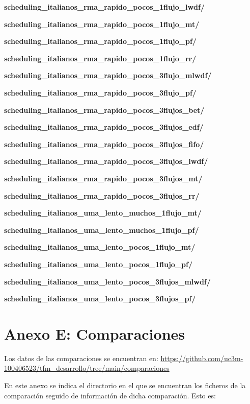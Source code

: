 \documentclass[12pt]{report} %
\begin{document}
\textbf{scheduling\_italianos\_rma\_rapido\_pocos\_1flujo\_lwdf/}

\textbf{scheduling\_italianos\_rma\_rapido\_pocos\_1flujo\_mt/}

\textbf{scheduling\_italianos\_rma\_rapido\_pocos\_1flujo\_pf/}

\textbf{scheduling\_italianos\_rma\_rapido\_pocos\_1flujo\_rr/}

\textbf{scheduling\_italianos\_rma\_rapido\_pocos\_3flujo\_mlwdf/}

\textbf{scheduling\_italianos\_rma\_rapido\_pocos\_3flujo\_pf/}

\textbf{scheduling\_italianos\_rma\_rapido\_pocos\_3flujos\_bet/}

\textbf{scheduling\_italianos\_rma\_rapido\_pocos\_3flujos\_edf/}

\textbf{scheduling\_italianos\_rma\_rapido\_pocos\_3flujos\_fifo/}

\textbf{scheduling\_italianos\_rma\_rapido\_pocos\_3flujos\_lwdf/}

\textbf{scheduling\_italianos\_rma\_rapido\_pocos\_3flujos\_mt/}

\textbf{scheduling\_italianos\_rma\_rapido\_pocos\_3flujos\_rr/}

\textbf{scheduling\_italianos\_uma\_lento\_muchos\_1flujo\_mt/}

\textbf{scheduling\_italianos\_uma\_lento\_muchos\_1flujo\_pf/}

\textbf{scheduling\_italianos\_uma\_lento\_pocos\_1flujo\_mt/}

\textbf{scheduling\_italianos\_uma\_lento\_pocos\_1flujo\_pf/}

\textbf{scheduling\_italianos\_uma\_lento\_pocos\_3flujos\_mlwdf/}

\textbf{scheduling\_italianos\_uma\_lento\_pocos\_3flujos\_pf/}










\chapter* {Anexo E: Comparaciones}

Los datos de las comparaciones se encuentran en: \url{https://github.com/uc3m-100406523/tfm_desarrollo/tree/main/comparaciones}

En este anexo se indica el directorio en el que se encuentran los ficheros de la comparación seguido de información de dicha comparación.
Esto es:
\end{document}
